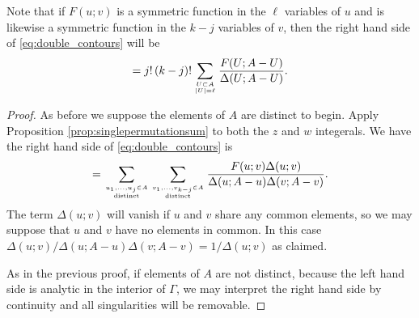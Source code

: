 \documentclass[12pt]{amsart}
\begin{document}
	Note that if $F(u;v)$ is a symmetric function in the $\ell$ variables of $u$ and is likewise a symmetric function in the $k-j$ variables of $v$, then the right hand side of \eqref{eq:double_contours} will be
	$$
	= j! \,(k-j)! \sum_{U \subset A \atop |U| = \ell} \frac{F(U; A-U)}{\Delta(U;A-U)}.
	$$
	
	\begin{proof}
		As before we suppose the elements of $A$ are distinct to begin. Apply Proposition \ref{prop:singlepermutationsum} to both the $z$ and $w$ integerals. We have the right hand side of \eqref{eq:double_contours} is
		$$
		= \sum_{u_1,...,u_j \in A \atop \textrm{distinct}} \sum_{v_1,...,v_{k-j} \in A \atop \textrm{distinct}} \frac{F(u;v) \Delta(u;v)}{\Delta(u;A-u)\Delta(v;A-v)}.
		$$
		The term $\Delta(u;v)$ will vanish if $u$ and $v$ share any common elements, so we may suppose that $u$ and $v$ have no elements in common. In this case $\Delta(u;v)/\Delta(u;A-u)\Delta(v;A-v) = 1/\Delta(u;v)$ as claimed.
		
		As in the previous proof, if elements of $A$ are not distinct, because the left hand side is analytic in the interior of $\Gamma$, we may interpret the right hand side by continuity and all singularities will be removable.
	\end{proof}
	
\end{document}
